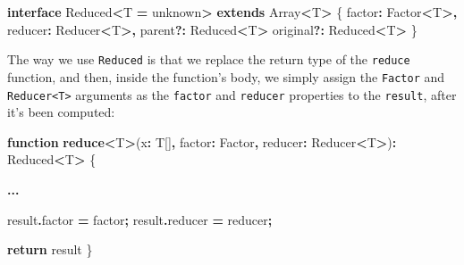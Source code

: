 \documentclass[
  openany]{book}
\newenvironment{Shaded}{\begin{snugshade}}{\end{snugshade}}
\newcommand{\AttributeTok}[1]{\textcolor[rgb]{0.13,0.29,0.53}{#1}}
\newcommand{\BuiltInTok}[1]{#1}
\newcommand{\ControlFlowTok}[1]{\textcolor[rgb]{0.13,0.29,0.53}{\textbf{#1}}}
\newcommand{\DataTypeTok}[1]{\textcolor[rgb]{0.13,0.29,0.53}{#1}}
\newcommand{\FunctionTok}[1]{\textcolor[rgb]{0.13,0.29,0.53}{\textbf{#1}}}
\newcommand{\KeywordTok}[1]{\textcolor[rgb]{0.13,0.29,0.53}{\textbf{#1}}}
\newcommand{\NormalTok}[1]{#1}
\newcommand{\OperatorTok}[1]{\textcolor[rgb]{0.81,0.36,0.00}{\textbf{#1}}}
\theoremstyle{definition}
\theoremstyle{definition}
\theoremstyle{definition}
\theoremstyle{definition}
\theoremstyle{remark}
\begin{document}
\begin{Shaded}
\begin{Highlighting}[]
\KeywordTok{interface}\NormalTok{ Reduced}\OperatorTok{\textless{}}\NormalTok{T }\OperatorTok{=} \DataTypeTok{unknown}\OperatorTok{\textgreater{}} \KeywordTok{extends} \BuiltInTok{Array}\OperatorTok{\textless{}}\NormalTok{T}\OperatorTok{\textgreater{}}\NormalTok{ \{}
\NormalTok{  factor}\OperatorTok{:}\NormalTok{ Factor}\OperatorTok{\textless{}}\NormalTok{T}\OperatorTok{\textgreater{},}
\NormalTok{  reducer}\OperatorTok{:}\NormalTok{ Reducer}\OperatorTok{\textless{}}\NormalTok{T}\OperatorTok{\textgreater{},}
\NormalTok{  parent}\OperatorTok{?:}\NormalTok{ Reduced}\OperatorTok{\textless{}}\NormalTok{T}\OperatorTok{\textgreater{}}
\NormalTok{  original}\OperatorTok{?:}\NormalTok{ Reduced}\OperatorTok{\textless{}}\NormalTok{T}\OperatorTok{\textgreater{}}
\NormalTok{\}}
\end{Highlighting}
\end{Shaded}

The way we use \texttt{Reduced} is that we replace the return type of the \texttt{reduce} function, and then, inside the function's body, we simply assign the \texttt{Factor} and \texttt{Reducer\textless{}T\textgreater{}} arguments as the \texttt{factor} and \texttt{reducer} properties to the \texttt{result}, after it's been computed:

\begin{Shaded}
\begin{Highlighting}[]
\KeywordTok{function} \FunctionTok{reduce}\OperatorTok{\textless{}}\NormalTok{T}\OperatorTok{\textgreater{}}\NormalTok{(x}\OperatorTok{:}\NormalTok{ T[]}\OperatorTok{,}\NormalTok{ factor}\OperatorTok{:}\NormalTok{ Factor}\OperatorTok{,} 
\NormalTok{                   reducer}\OperatorTok{:}\NormalTok{ Reducer}\OperatorTok{\textless{}}\NormalTok{T}\OperatorTok{\textgreater{}}\NormalTok{)}\OperatorTok{:}\NormalTok{ Reduced}\OperatorTok{\textless{}}\NormalTok{T}\OperatorTok{\textgreater{}}\NormalTok{ \{}
  
  \OperatorTok{...}
  
\NormalTok{  result}\OperatorTok{.}\AttributeTok{factor} \OperatorTok{=}\NormalTok{ factor}\OperatorTok{;}
\NormalTok{  result}\OperatorTok{.}\AttributeTok{reducer} \OperatorTok{=}\NormalTok{ reducer}\OperatorTok{;}
  
  \ControlFlowTok{return}\NormalTok{ result}
\NormalTok{\}}
\end{Highlighting}
\end{Shaded}
\end{document}

